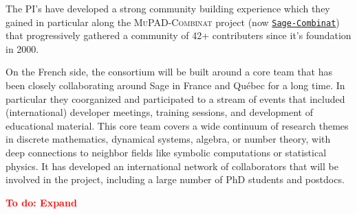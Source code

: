 \documentclass[a4,12pt]{amsart}
\newcommand{\sagecombinat}{\href{http://wiki.sagemath.org/combinat/}{\texttt{Sage-Combinat}}\xspace}
\newcommand{\TODO}[2][To do: ]{{\textcolor{red}{\textbf{#1#2}}}}
\begin{document}
The PI's have developed a strong community building experience which
they gained in particular along the \textsc{MuPAD-Combinat} project
(now \sagecombinat) that progressively gathered a community of 42+
contributers since it's foundation in 2000.

On the French side, the consortium will be built around a core team
that has been closely collaborating around Sage in France and Québec
for a long time.
In particular they coorganized and participated to a stream of events
that included (international) developer meetings, training sessions,
and development of educational material.
%
This core team covers a wide continuum of research themes in discrete
mathematics, dynamical systems, algebra, or number theory, with deep
connections to neighbor fields like symbolic computations or
statistical physics. It has developed an international network of
collaborators that will be involved in the project, including a large
number of PhD students and postdocs.

\TODO{Expand}



\end{document}
